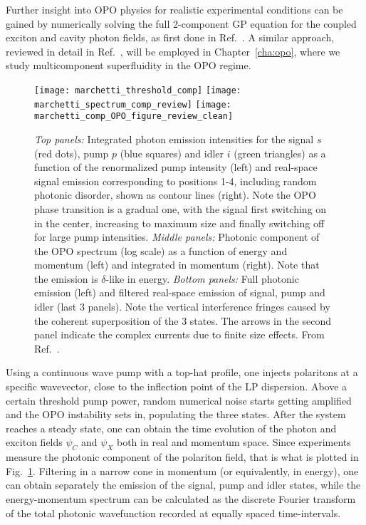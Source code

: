 Further insight into OPO physics for realistic experimental conditions
can be gained by numerically solving the full 2-component GP equation
for the coupled exciton and cavity photon fields, as first done in
Ref.~\cite{Whittaker_2005_c}.  A similar approach, reviewed in detail in
Ref.~\cite{9783642241857}, will be employed in Chapter~\ref{cha:opo},
where we study multicomponent superfluidity in the OPO regime.
%
\begin{figure}[tb]\centering
  \texttt{[image: marchetti\_threshold\_comp]}
  \texttt{[image: marchetti\_spectrum\_comp\_review]}
  \texttt{[image: marchetti\_comp\_OPO\_figure\_review\_clean]}
  \caption{
    \emph{Top panels:} Integrated photon emission intensities for the signal $s$ (red dots), pump $p$ (blue squares) and idler $i$ (green triangles) as a function of the renormalized pump intensity (left) and real-space signal emission corresponding to positions 1-4, including random photonic disorder, shown as contour lines (right). Note the OPO phase transition is a gradual one, with the signal first switching on in the center, increasing to maximum size and finally switching off for large pump intensities.
    \emph{Middle panels:} Photonic component of the OPO spectrum (log scale) as a function of energy and momentum (left) and integrated in momentum (right). Note that the emission is $\delta$-like in energy.
    \emph{Bottom panels:} Full photonic emission (left) and filtered real-space emission of signal, pump and idler (last 3 panels). Note the vertical interference fringes caused by the coherent superposition of the 3 states. The arrows in the second panel indicate the complex currents due to  finite size effects.
    From Ref.~\cite{9783642241857}.
  }\label{fig:marchetti}
\end{figure}
%
Using a continuous wave pump with a top-hat profile, one injects
polaritons at a specific wavevector, close to the inflection point of
the LP dispersion. Above a certain threshold pump power, random
numerical noise starts getting amplified and the OPO instability sets
in, populating the three states. After the system reaches a steady
state, one can obtain the time evolution of the photon and exciton
fields $\psi_C$ and $\psi_X$ both in real and momentum space. Since
experiments measure the photonic component of the polariton field,
that is what is plotted in Fig.~\ref{fig:marchetti}. Filtering in a
narrow cone in momentum (or equivalently, in energy), one can obtain
separately the emission of the signal, pump and idler states, while
the energy-momentum spectrum can be calculated as the discrete Fourier
transform of the total photonic wavefunction recorded at equally
spaced time-intervals.

